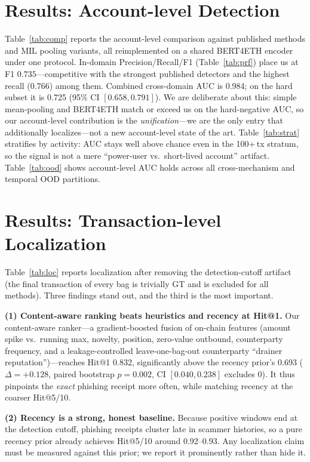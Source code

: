 \documentclass[conference]{IEEEtran}
\begin{document}
\section{Results: Account-level Detection}
Table~\ref{tab:comp} reports the account-level comparison against published methods
and MIL pooling variants, all reimplemented on a shared BERT4ETH encoder under one
protocol. In-domain Precision/Recall/F1 (Table~\ref{tab:prf}) place us at
F1 $0.735$---competitive with the strongest published detectors and the highest
recall ($0.766$) among them. Combined cross-domain AUC is 0.984; on the hard subset
it is 0.725 (95\% CI $[0.658,0.791]$). We are deliberate about this: simple mean-pooling and BERT4ETH
match or exceed us on the hard-negative AUC, so our account-level contribution is
the \emph{unification}---we are the only entry that additionally localizes---not a
new account-level state of the art. Table~\ref{tab:strat} stratifies by activity:
AUC stays well above chance even in the 100+\,tx stratum, so the signal is not a
mere ``power-user vs.\ short-lived account'' artifact. Table~\ref{tab:ood} shows
account-level AUC holds across all cross-mechanism and temporal OOD partitions.

\section{Results: Transaction-level Localization}\label{sec:loc}
Table~\ref{tab:loc} reports localization after removing the detection-cutoff
artifact (the final transaction of every bag is trivially GT and is excluded for
all methods). Three findings stand out, and the third is the most important.

\noindent\textbf{(1) Content-aware ranking beats heuristics and recency at Hit@1.}
Our content-aware ranker---a gradient-boosted fusion of on-chain features
(amount spike vs.\ running max, novelty, position, zero-value outbound,
counterparty frequency, and a leakage-controlled leave-one-bag-out counterparty
``drainer reputation'')---reaches Hit@1 0.832, significantly above the recency
prior's 0.693 ($\Delta{=}{+}0.128$, paired bootstrap $p{=}0.002$, CI $[0.040,0.238]$
excludes 0). It thus pinpoints the \emph{exact} phishing receipt more often, while
matching recency at the coarser Hit@5/10.

\noindent\textbf{(2) Recency is a strong, honest baseline.} Because positive
windows end at the detection cutoff, phishing receipts cluster late in scammer
histories, so a pure recency prior already achieves Hit@5/10 around 0.92--0.93. Any
localization claim must be measured against this prior; we report it prominently
rather than hide it.
\end{document}
